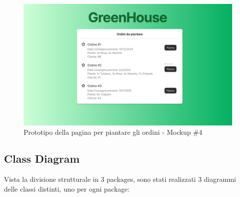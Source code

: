 \documentclass{article}
\begin{document}
\begin{figure}[H]
    \centering
    \includegraphics[scale=0.35]{resources/images/Mockups/mockup_4.png}
    \caption{Prototipo della pagina per piantare gli ordini - Mockup \#4}
    \label{fig:mockup_4}
\end{figure}

\subsection{Class Diagram}
Vista la divisione strutturale in 3 packages, sono stati realizzati 3 diagrammi delle classi distinti, uno per ogni package:
\end{document}
